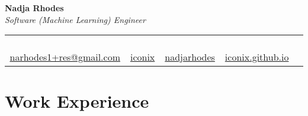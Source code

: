 \documentclass[10pt,letterpaper]{article}
\newcommand{\contactinfo}[5]{
  \begin{center}
    {\huge\textbf{#1}}\\[0.2em]
    {\large\textit{#2}}\\[0.5em]
    \begin{tabular}{ccccc}
      \faEnvelope\, \href{mailto:#3}{#3} &
      \faGithub\, \href{https://github.com/#4}{#4} &
      \faLinkedin\, \href{https://linkedin.com/in/#5}{#5} &
      \faGlobe\, \href{https://#4.github.io}{#4.github.io}
    \end{tabular}
  \end{center}
}
\begin{document}
\contactinfo{Nadja Rhodes}{Software (Machine Learning) Engineer}{narhodes1+res@gmail.com}{iconix}{nadjarhodes}


\section{Work Experience}
\end{document}

